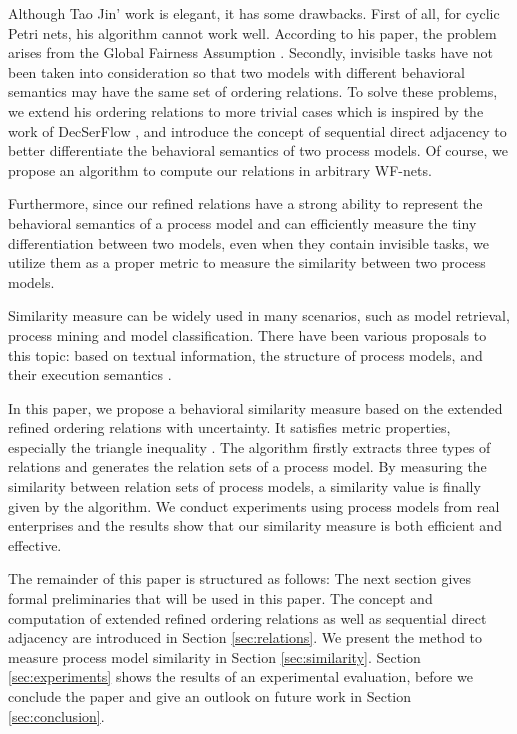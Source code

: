 \documentclass{llncs}
\begin{document}
Although Tao Jin' work is elegant, it has some drawbacks. First of all, for cyclic Petri nets, his algorithm cannot work well. According to his paper, the problem arises from the Global Fairness Assumption \cite{kindler1999liveness}. Secondly, invisible tasks have not been taken into consideration so that two models with different behavioral semantics may have the same set of ordering relations. To solve these problems, we extend his ordering relations to more trivial cases which is inspired by the work of DecSerFlow \cite{van2006decserflow}, and introduce the concept of sequential direct adjacency to better differentiate the behavioral semantics of two process models. Of course, we propose an algorithm to compute our relations in arbitrary WF-nets.

Furthermore, since our refined relations have a strong ability to represent the behavioral semantics of a process model and can efficiently measure the tiny differentiation between two models, even when they contain invisible tasks, we utilize them as a proper metric to measure the similarity between two process models.

Similarity measure can be widely used in many scenarios, such as model retrieval, process mining and model classification. There have been various proposals to this topic: based on textual information, the structure of process models, and their execution semantics \cite{kunze2011behavioral}.

In this paper, we propose a behavioral similarity measure based on the extended refined ordering relations with uncertainty. It satisfies metric properties, especially the triangle inequality \cite{zezula2006similarity}. The algorithm firstly extracts three types of relations and generates the relation sets of a process model. By measuring the similarity between relation sets of process models, a similarity value is finally given by the algorithm. We conduct experiments using process models from real enterprises and the results show that our similarity measure is both efficient and effective.

The remainder of this paper is structured as follows: The next section gives formal preliminaries that will be used in this paper. The concept and computation of extended refined ordering relations as well as sequential direct adjacency are introduced in Section \ref{sec:relations}. We present the method to measure process model similarity in Section \ref{sec:similarity}. Section \ref{sec:experiments} shows the results of an experimental evaluation, before we conclude the paper and give an outlook on future work in Section \ref{sec:conclusion}.
\end{document}
